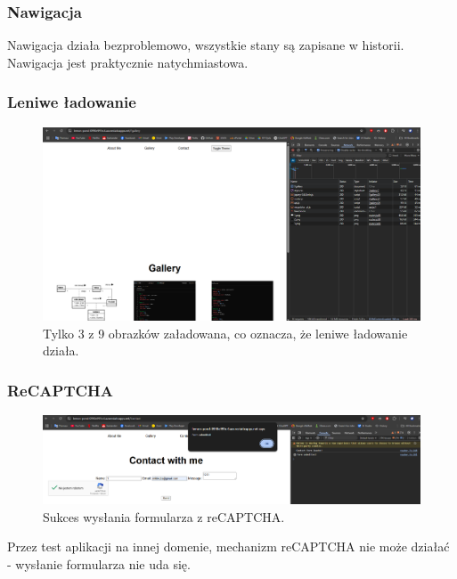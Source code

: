 \documentclass[a4paper,12pt]{article}
\begin{document}
\subsubsection{Nawigacja}

Nawigacja działa bezproblemowo, wszystkie stany są zapisane w historii. Nawigacja jest praktycznie natychmiastowa.

\subsubsection{Leniwe ładowanie}

\begin{figure}[H]
    \centering
    \includegraphics[width=1\textwidth]{images/lazy_2.png}
    \caption{Tylko 3 z 9 obrazków załadowana, co oznacza, że leniwe ładowanie działa.}
\end{figure}

\subsubsection{ReCAPTCHA}

\begin{figure}[H]
    \centering
    \includegraphics[width=1\textwidth]{images/contact_success.png}
    \caption{Sukces wysłania formularza z reCAPTCHA.}
\end{figure}

Przez test aplikacji na innej domenie, mechanizm reCAPTCHA nie może działać - wysłanie formularza nie uda się.
\end{document}

